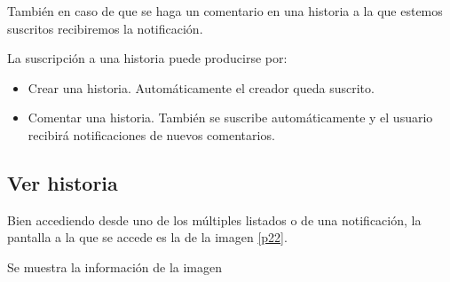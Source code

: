 \documentclass[11pt,a4paper, titlepage]{article}
\begin{document}
	También en caso de que se haga un comentario en una historia a la que estemos suscritos recibiremos la notificación.
	
	La suscripción a una historia puede producirse por:
	\begin{itemize}
		\item Crear una historia. Automáticamente el creador queda suscrito.
		\item Comentar una historia. También se suscribe automáticamente y el usuario recibirá notificaciones de nuevos comentarios.
	\end{itemize}
	
	\FloatBarrier
	\subsection{Ver historia}
	
	Bien accediendo desde uno de los múltiples listados o de una notificación, la pantalla a la que se accede es la de la imagen \ref{p22}.
	
	Se muestra la información de la imagen
	
\end{document}
